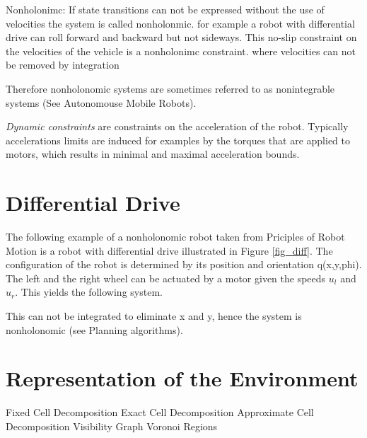 Nonholonimc:
If state transitions can not be expressed without the use of velocities the system is called nonholonmic.
for example a robot with differential drive can roll forward and backward but not sideways. 
This no-slip constraint on the velocities of the vehicle is a nonholonimc constraint.
where velocities can not be removed by integration 

Therefore nonholonomic systems are sometimes referred to as nonintegrable systems (See Autonomouse Mobile Robots).

\emph{Dynamic constraints} are constraints on the acceleration of the robot. Typically accelerations limits are induced for examples by the torques that are applied to motors, which results in minimal and maximal acceleration bounds.

\section{Differential Drive}\label{sec:ddrive}
The following example of a nonholonomic robot taken from Priciples of Robot Motion is a robot with differential drive illustrated in Figure \ref{fig_diff}.
The configuration of the robot is determined by its position and orientation q(x,y,phi).
The left and the right wheel can be actuated by a motor given the speeds $u_l$ and $u_r$.
This yields the following system.

This can not be integrated to eliminate x and y, hence the system is nonholonomic (see Planning algorithms).

\section{Representation of the Environment}\label{sec:representation}
Fixed Cell Decomposition
Exact Cell Decomposition
Approximate Cell Decomposition
Visibility Graph
Voronoi Regions

